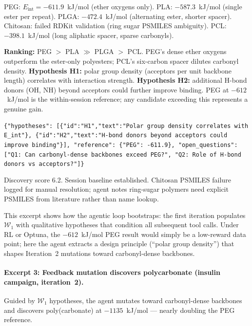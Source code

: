 \documentclass[twocolumn]{fairmeta}
\begin{document}
\begin{toolcall}
\scriptsize
PEG: $E_\text{int} = -611.9$~kJ/mol (ether oxygens only).
PLA: $-587.3$~kJ/mol (single ester per repeat).
PLGA: $-472.4$~kJ/mol (alternating ester, shorter spacer).
Chitosan: failed RDKit validation (ring sugar PSMILES ambiguity).
PCL: $-398.1$~kJ/mol (long aliphatic spacer, sparse carbonyls).
\end{toolcall}

\begin{agentthought}
\scriptsize
\textbf{Ranking:} PEG $>$ PLA $\gg$ PLGA $>$ PCL.
PEG's dense ether oxygens outperform the ester-only polyesters; PCL's six-carbon spacer dilutes carbonyl density.
\textbf{Hypothesis H1:} polar group density (acceptors per unit backbone length) correlates with interaction strength.
\textbf{Hypothesis H2:} additional H-bond donors (OH, NH) beyond acceptors could further improve binding.
PEG at $-612$~kJ/mol is the within-session reference; any candidate exceeding this represents a genuine gain.
\end{agentthought}

\begin{toolcall}
\scriptsize
\texttt{\{"hypotheses": [\{"id":"H1","text":"Polar group density correlates with E\_int"\}, \{"id":"H2","text":"H-bond donors beyond acceptors could improve binding"\}], "reference": \{"PEG": -611.9\}, "open\_questions": ["Q1: Can carbonyl-dense backbones exceed PEG?", "Q2: Role of H-bond donors vs acceptors?"]\}}
\end{toolcall}

\begin{observation}
\scriptsize
Discovery score 6.2.
Session baseline established.
Chitosan PSMILES failure logged for manual resolution; agent notes ring-sugar polymers need explicit PSMILES from literature rather than name lookup.
\end{observation}

\noindent This excerpt shows how the agentic loop bootstraps: the first iteration populates $\mathcal{W}_1$ with qualitative hypotheses that condition all subsequent tool calls.
Under RL or Optuna, the $-612$~kJ/mol PEG result would simply be a low-reward data point; here the agent extracts a design principle (``polar group density'') that shapes Iteration~2 mutations toward carbonyl-dense backbones.

\paragraph{Excerpt 3: Feedback mutation discovers polycarbonate (insulin campaign, iteration~2).}
Guided by $\mathcal{W}_1$ hypotheses, the agent mutates toward carbonyl-dense backbones and discovers poly(carbonate) at $-1135$~kJ/mol --- nearly doubling the PEG reference.
\end{document}
